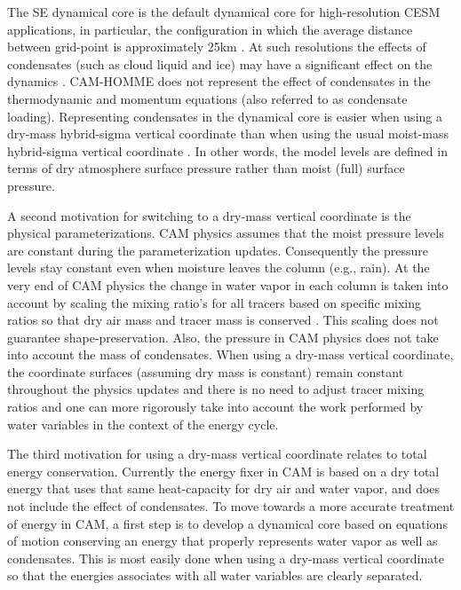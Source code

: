 \documentclass{agujournal}
\begin{document}
The SE dynamical core is the default dynamical core for high-resolution CESM applications, in particular, the configuration in which the average distance between grid-point is approximately 25km \citep{BetAl2013JC}. At such resolutions the effects of condensates (such as cloud liquid and ice) may have a significant effect on the dynamics \citep{BLDT2012GRL}. CAM-HOMME does not represent the effect of condensates in the thermodynamic and momentum equations (also referred to as condensate loading). Representing condensates in the dynamical core is easier when using a dry-mass hybrid-sigma vertical coordinate than when using the usual moist-mass hybrid-sigma vertical coordinate \citep[e.g., ][]{SB1981MWR}. In other words, the model levels are defined in terms of dry atmosphere surface pressure rather than moist (full) surface pressure.

A second motivation for switching to a dry-mass vertical coordinate is the physical parameterizations. CAM physics assumes that the moist pressure levels are constant during the parameterization updates. Consequently the pressure levels stay constant even when moisture leaves the column (e.g., rain). At the very end of CAM physics the change in water  vapor in each column is taken into account by scaling the mixing ratio's for all tracers based on specific mixing ratios so that dry air mass and tracer mass is conserved \citep[see Section 3.1.6 in ][]{CAM5}. This scaling does not guarantee shape-preservation. Also, the pressure in CAM physics does not take into account the mass of condensates. When using a dry-mass vertical coordinate, the coordinate surfaces (assuming dry mass is constant) remain constant throughout the physics updates and there is no need to adjust tracer mixing ratios and one can more rigorously take into account the work performed by water variables in the context of the energy cycle.

The third motivation for using a dry-mass vertical coordinate relates to total energy conservation. Currently the energy fixer in CAM is based on a dry total energy \citep{WOHTTV2015JAMES} that uses that same heat-capacity for dry air and water vapor, and does not include the effect of condensates. To move towards a more accurate treatment of energy in CAM, a first step is to develop a dynamical core based on equations of motion conserving an energy that properly represents water vapor as well as condensates. This is most easily done when using a dry-mass vertical coordinate so that the energies associates with all water variables are clearly separated.
\end{document}
